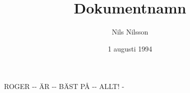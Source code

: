 \documentclass[a4paper]{article}
\title{Dokumentnamn}
\author{Nils Nilsson}
\date{1 augusti 1994}        %
\begin{document}

\maketitle                   %


ROGER \--\-- ÄR  -{}- BÄST PÅ -\-- ALLT! \--
\end{document}
